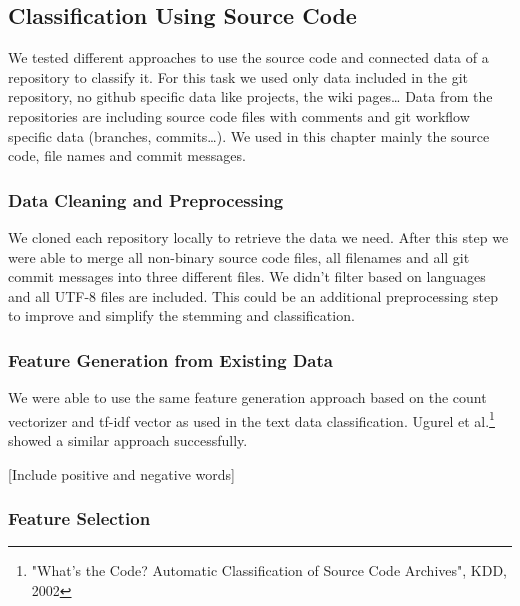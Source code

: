 \documentclass[%
a4paper,
DIV12,
2.5headlines,
bigheadings,
titlepage,
openbib,
]{scrartcl}
\begin{document}

\subsection{Classification Using Source
Code}\label{classification-using-source-code}

We tested different approaches to use the source code and connected data of a repository to classify it.
For this task we used only data included in the git repository, no github specific data like projects, the wiki pages\ldots{} Data from the repositories are including source code files with comments and git workflow specific data (branches, commits\ldots{}).
We used in this chapter mainly the source code, file names and commit messages.

\subsubsection{Data Cleaning and
Preprocessing}\label{data-cleaning-and-preprocessing-2}

We cloned each repository locally to retrieve the data we need.
After this step we were able to merge all non-binary source code files, all filenames and all git commit messages into three different files.
We didn't filter based on languages and all UTF-8 files are included.
This could be an additional preprocessing step to improve and simplify the stemming and classification.

\subsubsection{Feature Generation from Existing
Data}\label{feature-generation-from-existing-data-1}

We were able to use the same feature generation approach based on the count vectorizer and tf-idf vector as used in the text data classification.
Ugurel et al.\footnote{"What's the Code? Automatic Classification of Source Code Archives", KDD, 2002} showed a similar approach successfully.

[Include positive and negative words]

\subsubsection{Feature Selection}\label{feature-selection-2}

\end{document}
